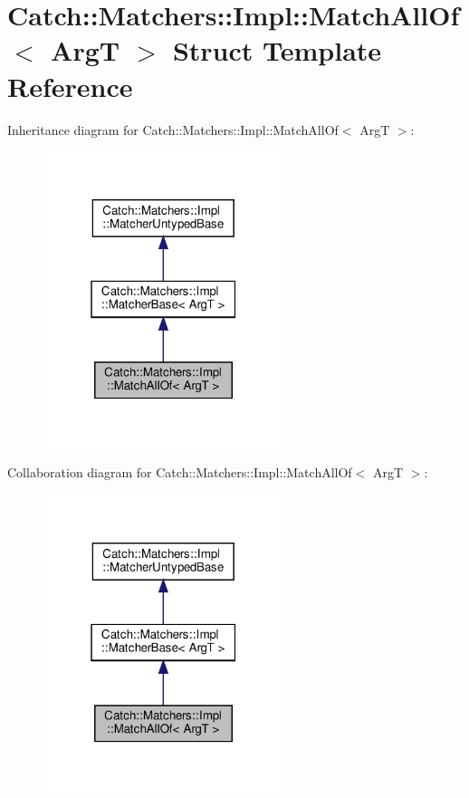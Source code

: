 \hypertarget{structCatch_1_1Matchers_1_1Impl_1_1MatchAllOf}{}\section{Catch\+:\+:Matchers\+:\+:Impl\+:\+:Match\+All\+Of$<$ ArgT $>$ Struct Template Reference}
\label{structCatch_1_1Matchers_1_1Impl_1_1MatchAllOf}


Inheritance diagram for Catch\+:\+:Matchers\+:\+:Impl\+:\+:Match\+All\+Of$<$ ArgT $>$\+:\nopagebreak
\begin{figure}[H]
\begin{center}
\leavevmode
\includegraphics[width=199pt]{structCatch_1_1Matchers_1_1Impl_1_1MatchAllOf__inherit__graph}
\end{center}
\end{figure}


Collaboration diagram for Catch\+:\+:Matchers\+:\+:Impl\+:\+:Match\+All\+Of$<$ ArgT $>$\+:\nopagebreak
\begin{figure}[H]
\begin{center}
\leavevmode
\includegraphics[width=199pt]{structCatch_1_1Matchers_1_1Impl_1_1MatchAllOf__coll__graph}
\end{center}
\end{figure}
